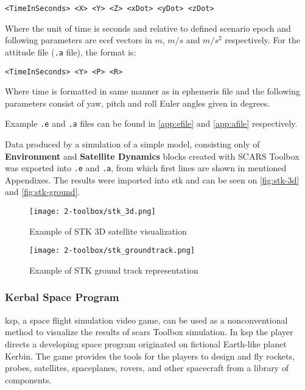         \begin{Verbatim}[fontsize=\small]
<TimeInSeconds> <X> <Y> <Z> <xDot> <yDot> <zDot>
        \end{Verbatim}

        Where the unit of time is seconds and relative to defined scenario epoch and following parameters are \ac{ecef} vectors in $m$, $m/s$ and $m/s^2$ respectively. For the attitude file (\verb|.a| file), the format is:
        
        \begin{Verbatim}[fontsize=\small]
<TimeInSeconds> <Y> <P> <R>
        \end{Verbatim}
        
        Where time is formatted in same manner as in ephemeris file and the following parameters consist of yaw, pitch and roll Euler angles given in degrees.

        Example \verb|.e| and \verb|.a| files can be found in \autoref{app:efile} and \autoref{app:afile} respectively.


        Data produced by a simulation of a simple model, consisting only of \textbf{Environment} and \textbf{Satellite Dynamics} blocks created with SCARS Toolbox was exported into  \verb|.e| and \verb|.a|, from which first lines are shown in mentioned Appendixes. The results were imported into \ac{stk} and can be seen on \autoref{fig:stk-3d} and \autoref{fig:stk-ground}.
        
        \begin{figure}[H]
            \centering
            \texttt{[image: 2-toolbox/stk\_3d.png]}
            \caption{Example of STK 3D satellite visualization}
            \label{fig:stk-3d}
        \end{figure}

        \begin{figure}[H]
            \centering
            \texttt{[image: 2-toolbox/stk\_groundtrack.png]}
            \caption{Example of STK ground track representation}
            \label{fig:stk-ground}
        \end{figure}


    \subsubsection{Kerbal Space Program}\label{sec:ksp}
        \ac{ksp}, a space flight simulation video game, can be used as a nonconventional method to visualize the results of \ac{scars} Toolbox simulation. In \ac{ksp} the player directs a developing space program originated on fictional Earth-like planet Kerbin. The game provides the tools for the players to design and fly rockets, probes, satellites, spaceplanes, rovers, and other spacecraft from a library of components\cite{kerbals}. 

